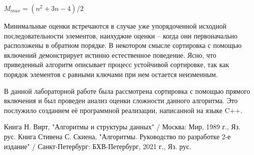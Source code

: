 \documentclass[bachelor, och, labwork]{shiza}
\begin{document}
    $M_{max} = (n^2 + 3n - 4) / 2$

  Минимальные оценки встречаются в случае уже упорядоченной исходной последовательности элементов,
  наихуджие оценки -- когда они первоначально расположены в обратном порядке. В некотором смысле
  сортировка с помощью включений демонстрирует истинно естественное поведение. Ясно, что приведенный
  алгоритм описывает процесс устойчивой сортировке, так как порядок элементов с равными ключами при
  нем остается неизменным.







\conclusion

В данной лабораторной работе была рассмотрена сортировка с помощью прямого включения и был проведен анализ оценки
сложности данного алгоритма. Это послужило созданием её программной реализации, написанной на языке C++. 

\begin{thebibliography}{2}
  Книга Н. Вирт, "Алгоритмы и структуры данных" / Москва: Мир, 1989 г., Яз. рус.
  Книга Стивена С. Скиена, "Алгоритмы. Руководство по разработке 2-е издание" / Санкт-Петербург: БХВ-Петербург, 2021 г., Яз. рус.   
\end{thebibliography}
\end{document}
